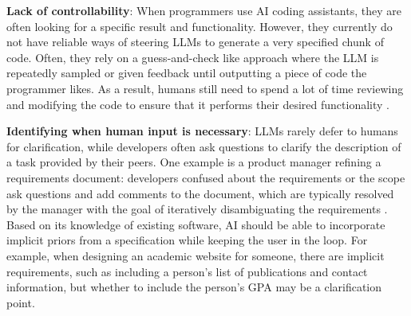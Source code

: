\textbf{Lack of controllability}: When programmers use AI coding assistants, they are often looking for a specific result and functionality. However, they currently do not have reliable ways of steering LLMs to generate a very specified chunk of code. Often, they rely on a guess-and-check like approach where the LLM is repeatedly sampled or given feedback until outputting a piece of code the programmer likes. As a result, humans still need to spend a lot of time reviewing and modifying the code to ensure that it performs their desired functionality \citep{weisz2024examining}. 

\textbf{Identifying when human input is necessary}: LLMs rarely defer to humans for clarification, while developers often ask questions to clarify the description of a task provided by their peers. One example is a product manager refining a requirements document: developers confused about the requirements or the scope ask questions and add comments to the document, which are typically resolved by the manager with the goal of iteratively disambiguating the requirements \citep{nahar2022collaboration}. Based on its knowledge of existing software, AI should be able to incorporate implicit priors from a specification while keeping the user in the loop. For example, when designing an academic website for someone, there are implicit requirements, such as including a person's list of publications and contact information, but whether to include the person's GPA may be a clarification point.








